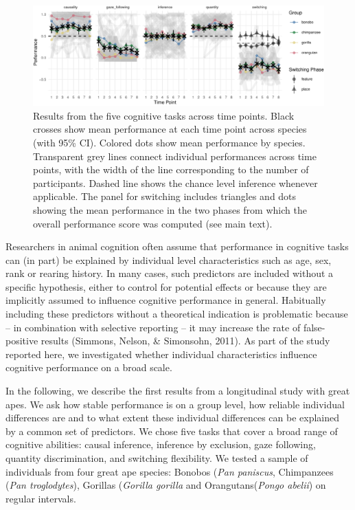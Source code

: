 \documentclass[10pt, letterpaper]{article}
\newenvironment{CodeChunk}{}{}
\begin{document}
\begin{CodeChunk}
\begin{figure}[h]

{\centering \includegraphics{figs/perfplot-1} 

}

\caption[Results from the five cognitive tasks across time points]{Results from the five cognitive tasks across time points. Black crosses show mean performance at each time point across species (with 95\% CI). Colored dots show mean performance by species. Transparent grey lines connect individual performances across time points, with the width of the line corresponding to the number of participants. Dashed line shows the chance level inference whenever applicable. The panel for switching includes triangles and dots showing the mean performance in the two phases from which the overall performance score was computed (see main text).}\label{fig:perfplot}
\end{figure}
\end{CodeChunk}

Researchers in animal cognition often assume that performance in
cognitive tasks can (in part) be explained by individual level
characteristics such as age, sex, rank or rearing history. In many
cases, such predictors are included without a specific hypothesis,
either to control for potential effects or because they are implicitly
assumed to influence cognitive performance in general. Habitually
including these predictors without a theoretical indication is
problematic because -- in combination with selective reporting -- it may
increase the rate of false-positive results (Simmons, Nelson, \&
Simonsohn, 2011). As part of the study reported here, we investigated
whether individual characteristics influence cognitive performance on a
broad scale.

In the following, we describe the first results from a longitudinal
study with great apes. We ask how stable performance is on a group
level, how reliable individual differences are and to what extent these
individual differences can be explained by a common set of predictors.
We chose five tasks that cover a broad range of cognitive abilities:
causal inference, inference by exclusion, gaze following, quantity
discrimination, and switching flexibility. We tested a sample of
individuals from four great ape species: Bonobos (\emph{Pan paniscus},
Chimpanzees (\emph{Pan troglodytes}), Gorillas (\emph{Gorilla gorilla}
and Orangutans(\emph{Pongo abelii}) on regular intervals.
\end{document}
